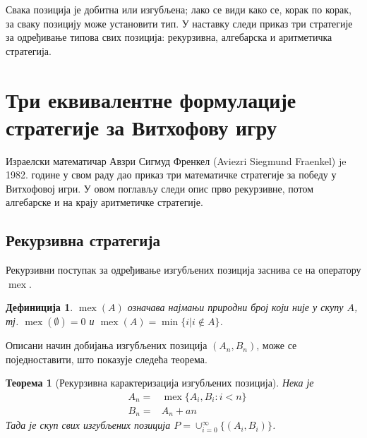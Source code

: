 \documentclass[a4paper]{article}
\newtheorem{theorem}{Теорема}
\newtheorem{definition}{Дефиниција}
\DeclareMathOperator{\mex}{mex}
\begin{document}
Свака позиција је добитна или изгубљена; лако се види како се, корак по корак, за сваку позицију може установити тип. У наставку следи приказ три стратегије за одређивање типова свих позиција: рекурзивна, алгебарска и аритметичка стратегија.

\section{Три еквивалентне формулације стратегије за Витхофову игру}
\label{sec:tri_Strategije}

Израелски математичар Авзри Сигмуд Френкел (Aviezri Siegmund Fraenkel) je 1982. године у свом раду \cite{10.2307/2321643} дао приказ три математичке стратегије за победу у Витхофовој игри. У овом поглављу следи опис прво рекурзивне, потом алгебарске и на крају аритметичке стратегије.

\subsection{Рекурзивна стратегија}

Рекурзивни поступак за одређивање изгубљених позиција заснива се на оператору $ \mex $.

\begin{definition}
	\label{def:mex}
	$\mex(A)$ означава најмањи природни број који није у скупу $ A $, тј. $ \mex(\emptyset)=0 $ и
$ \mex(A)=\min\{i | i\notin A\} $.
\end{definition}

Описани начин добијања изгубљених позиција $ (A_{n}, B_{n}) $, може се поједноставити, што показује следећа теорема. 

\begin{theorem} [Рекурзивна карактеризација изгубљених позиција]
	\label{thm:reukrzivna_strategija}
	Нека је 
	\begin{eqnarray}
		&A_{n} = &\mex \{ A_{i}, B_{i} : i < n \}\\
		&B_{n} = &A_{n} + an
	\end{eqnarray}
	Тада је скуп свих изгубљених позиција
	$ P = \cup_{i=0}^{\infty} \{(A_{i},B_{i})\} $.
\end{theorem}
\end{document}
